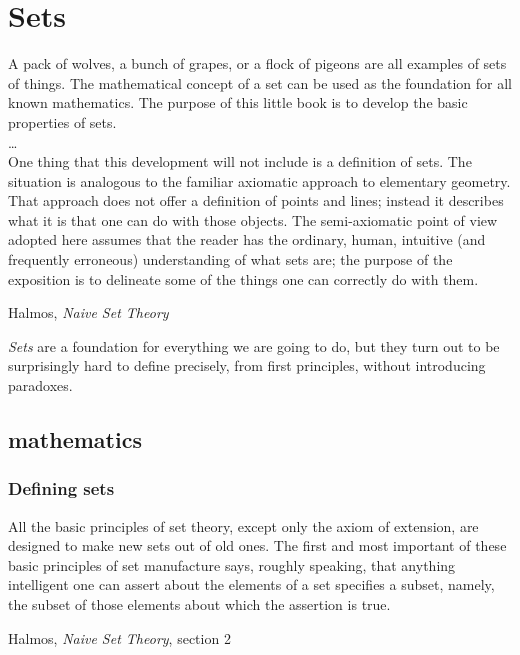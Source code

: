 \chapter{Sets}
\epigraph{A pack of wolves, a bunch of grapes, or a flock of
pigeons are all examples of sets of things.
The mathematical concept of a set can be used as the foundation
for all known mathematics.
The purpose of this little book is to develop the basic properties
of sets.\\
\ldots \\
One thing that this development will not include is a definition
of sets.
The situation is analogous to the familiar axiomatic approach to
elementary geometry.
That approach does not offer a definition of points and lines;
instead it describes what it is that one can do with those
objects.
The semi-axiomatic point of view adopted here assumes that the
reader has the ordinary, human, intuitive (and frequently
erroneous) understanding of what sets are; the purpose of the
exposition is to delineate some of the things one can correctly do
with them.}%
{Halmos, \textit{Naive Set Theory}\cite{Halmos1960Naive}}

\vfill

\emph{Sets} are a foundation for everything we are going to do,
but they turn out to be surprisingly hard to define precisely,
from first principles, without introducing paradoxes.

\vfill

\section{mathematics}
\label{sec:math-sets}
\lstset{language=Clojure}

\subsection{Defining sets}
\epigraph{All the basic principles of set theory, except only the
axiom of extension, are designed to make new sets out of old ones.
The first and most important of these basic principles of set
manufacture says, roughly speaking, that anything intelligent one
can assert about the elements of a set specifies a subset, namely,
the subset of those elements about which the assertion is true.}
{Halmos,
\textit{Naive Set Theory}, section 2~\cite{Halmos1960Naive}}

